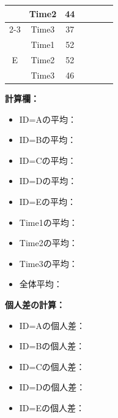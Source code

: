 \documentclass[a4paper,12pt]{ltjarticle}
\begin{document}
\begin{table}[ht]
\begin{tabular}{|c|c|c|c|c|c|c|}
		 & Time2 & 44 &  &  & \hspace{2cm} & \hspace{2cm} \\ \cline{2-3}\cline{6-7}
		 & Time3 & 37 &  &  & \hspace{2cm} & \hspace{2cm} \\ \hline
		\multirow{3}{*}{E} & Time1 & 52 &  & \multirow{3}{*}{\hspace{2cm}} & \hspace{2cm} & \hspace{2cm} \\ \cline{2-3}\cline{6-7}
		 & Time2 & 52 &  &  & \hspace{2cm} & \hspace{2cm} \\ \cline{2-3}\cline{6-7}
		 & Time3 & 46 &  &  & \hspace{2cm} & \hspace{2cm} \\ \hline
	\end{tabular}
\end{table}

\textbf{計算欄：}
\begin{itemize}
	\item[] ID=Aの平均：\underline{\hspace{3cm}}
	\item[] ID=Bの平均：\underline{\hspace{3cm}}
	\item[] ID=Cの平均：\underline{\hspace{3cm}}
	\item[] ID=Dの平均：\underline{\hspace{3cm}}
	\item[] ID=Eの平均：\underline{\hspace{3cm}}
	\item[] Time1の平均：\underline{\hspace{3cm}}
	\item[] Time2の平均：\underline{\hspace{3cm}}
	\item[] Time3の平均：\underline{\hspace{3cm}}
	\item[] 全体平均：\underline{\hspace{3cm}}
\end{itemize}

\textbf{個人差の計算：}
\begin{itemize}
	\item[] ID=Aの個人差：\underline{\hspace{3cm}}
	\item[] ID=Bの個人差：\underline{\hspace{3cm}}
	\item[] ID=Cの個人差：\underline{\hspace{3cm}}
	\item[] ID=Dの個人差：\underline{\hspace{3cm}}
	\item[] ID=Eの個人差：\underline{\hspace{3cm}}
\end{itemize}
\end{document}
